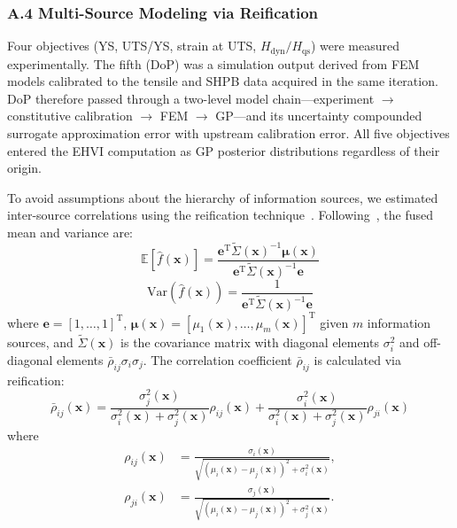 \documentclass[preprint,12pt,times]{elsarticle}  %
\begin{document}
\subsubsection*{A.4 Multi-Source Modeling via Reification}

Four objectives (YS, UTS/YS, strain at UTS, $H_\text{dyn}/H_\text{qs}$) were measured experimentally. The fifth (DoP) was a simulation output derived from FEM models calibrated to the tensile and SHPB data acquired in the same iteration. DoP therefore passed through a two-level model chain---experiment $\rightarrow$ constitutive calibration $\rightarrow$ FEM $\rightarrow$ GP---and its uncertainty compounded surrogate approximation error with upstream calibration error. All five objectives entered the EHVI computation as GP posterior distributions regardless of their origin.

To avoid assumptions about the hierarchy of information sources, we estimated inter-source correlations using the reification technique~\cite{allaire2012fusing,thomison2017model}. Following~\cite{Winkler_1981}, the fused mean and variance are:
\begin{equation}
\label{e:WinklerMeanGen_app}
\mathbb{E} [\hat{f}(\mathbf{x})]=\frac{\mathbf{e}^\textrm{T} \tilde{\Sigma}(\mathbf{x})^{-1}  \boldsymbol{\mu}(\mathbf{x})}{\mathbf{e}^\textrm{T} \tilde{\Sigma}(\mathbf{x})^{-1} \mathbf{e}}
\end{equation}
\begin{equation}
\label{e:WinklerVarianceGen_app}
\textrm{Var}\left(\hat{f}(\mathbf{x})\right) = \frac{1}{\mathbf{e}^\textrm{T} \tilde{\Sigma}(\mathbf{x})^{-1} \mathbf{e}}
\end{equation}
where $\mathbf{e} = [1,\ldots,1]^\textrm{T}$, $\boldsymbol{\mu}(\mathbf{x}) = [\mu_1(\mathbf{x}),\ldots,\mu_m(\mathbf{x})]^\textrm{T}$ given $m$ information sources, and $\tilde{\Sigma}(\mathbf{x})$ is the covariance matrix with diagonal elements $\sigma_i^2$ and off-diagonal elements $\bar{\rho}_{ij} \sigma_i \sigma_j$. The correlation coefficient $\bar{\rho}_{ij}$ is calculated via reification:
\begin{equation}
\bar{\rho}_{ij}(\mathbf{x}) = \frac{\sigma_j^2(\mathbf{x})}{\sigma_i^2(\mathbf{x}) + \sigma_j^2(\mathbf{x})} \rho_{ij}(\mathbf{x}) + \frac{\sigma_i^2(\mathbf{x})}{\sigma_i^2(\mathbf{x})+\sigma_j^2(\mathbf{x})} \rho_{ji}(\mathbf{x})
\label{e:VWrho_app}
\end{equation}
where
\begin{equation}
\begin{aligned}
\rho_{ij}(\mathbf{x}) &= \frac{\sigma_i(\mathbf{x})}{\sqrt{\left(\mu_i(\mathbf{x})-\mu_j(\mathbf{x})\right)^2 + \sigma_i^2(\mathbf{x})}}, \\
\rho_{ji}(\mathbf{x}) &= \frac{\sigma_j(\mathbf{x})}{\sqrt{\left(\mu_i(\mathbf{x})-\mu_j(\mathbf{x})\right)^2 + \sigma_j^2(\mathbf{x})}}.
\end{aligned}
\label{e:rho_app}
\end{equation}
\end{document}
